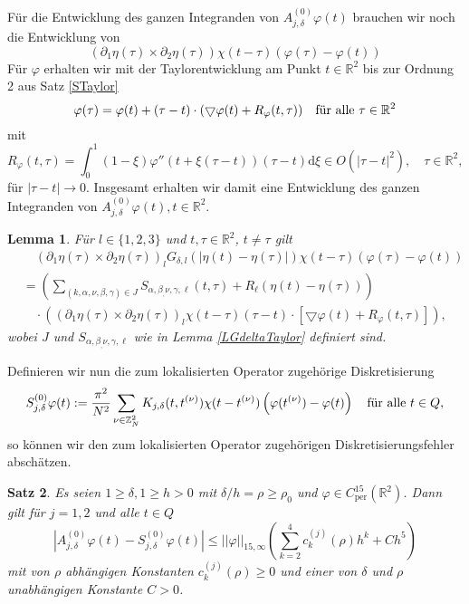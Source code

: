 \documentclass[12pt,a4paper]{scrartcl}
\newtheorem{Satz}{Satz}[section]
\newtheorem{Lemma}[Satz]{Lemma}
\newcommand{\dd}{\mathrm{d}}
\numberwithin{equation}{section}
\newcommand{\R}{\mathbb{R}} %
\newcommand{\Z}{\mathbb{Z}} %
\newcommand{\N}{\mathbb{N}} %
\newcommand{\grad}{\bigtriangledown}
\newcommand{\per}{\operatorname{per}}
\newcommand{\fa}{\text{\quad für alle }}
\begin{document}
Für die Entwicklung des ganzen Integranden von $A^{(0)}_{j,\delta}\varphi(t)$ brauchen wir noch die Entwicklung von
\[
(\partial_1 \eta (\tau) \times \partial_2 \eta(\tau))\chi(t-\tau)(\varphi(\tau)- \varphi(t))
\]
Für $\varphi$ erhalten wir mit der Taylorentwicklung am Punkt $t \in \R^2$ bis zur Ordnung 2 aus Satz \ref{STaylor}
\[
\varphi(\tau) = \varphi(t)+  (\tau-t) \cdot (\grad\varphi(t) + R_\varphi(t,\tau)) \fa \tau \in \R^2
\] 
mit \[
R_\varphi(t,\tau)= \int_0^1 (1-\xi) \varphi''(t+\xi(\tau-t))(\tau-t) \dd \xi \in O(|\tau - t|^2), \quad \tau \in \R^2,
\] für $|\tau- t| \to 0$.
Insgesamt erhalten wir damit eine Entwicklung des ganzen Integranden von $A^{(0)}_{j,\delta}\varphi(t) ,t\in \R^2$.
\begin{Lemma} \label{LTint}
Für $l \in \{1,2,3\}$ und $t,\tau \in \R^2$, $t\neq \tau$ gilt
\begin{align*}
& \quad (\partial_1 \eta (\tau) \times \partial_2 \eta(\tau))_l G_{\delta,l}(|\eta(t)-\eta(\tau)|) \chi(t-\tau)(\varphi(\tau)- \varphi(t)) \\
&= \left(\sum_{(k,\alpha,\nu,\beta,\gamma)\in J} S_{\alpha,\beta_,\nu,\gamma,\ell}(t,\tau) + R_\ell(\eta(t)-\eta(\tau))\right)\\
&\quad\cdot  \left((\partial_1 \eta (\tau) \times \partial_2 \eta(\tau))_l\chi(t-\tau)(\tau-t) \cdot\left[\grad\varphi(t) + R_\varphi(t,\tau) \right] \right),
\end{align*}
wobei $J$ und $S_{\alpha,\beta_,\nu,\gamma,\ell}$ wie in Lemma \ref{LGdeltaTaylor} definiert sind.
\end{Lemma}
Definieren wir nun die zum lokalisierten Operator zugehörige Diskretisierung
\[
S^{(0)}_{j,\delta}\varphi(t) := \frac{\pi^2}{N^2}\sum_{\nu\in\Z_N^2}  K_{j,\delta}(t,t^{(\nu)})\chi(t-t^{(\nu)}) \left(\varphi(t^{(\nu)})- \varphi(t)\right) \fa t \in Q,
\]
so können wir den zum lokalisierten Operator zugehörigen Diskretisierungsfehler abschätzen.
\begin{Satz} \label{Sdiskeps}
Es seien $ 1\geq \delta, 1 \geq h>0$ mit $\delta/h = \rho \geq \rho_0$ und $\varphi \in C_{\per}^{15}(\R^2)$. Dann gilt für $j=1,2$ und alle $t \in Q$
\[
|A^{(0)}_{j,\delta}\varphi(t) - S^{(0)}_{j,\delta}\varphi(t)| \leq ||\varphi||_{15,\infty}\left( \sum_{k=2}^4 c_k^{(j)}( \rho) h^k + C h^5 \right)
\]
mit von $\rho$ abhängigen Konstanten $c_k^{(j)}(\rho)\geq 0$ und einer von $\delta$ und $\rho$ unabhängigen Konstante $C>0$.
\end{Satz}
\end{document}
